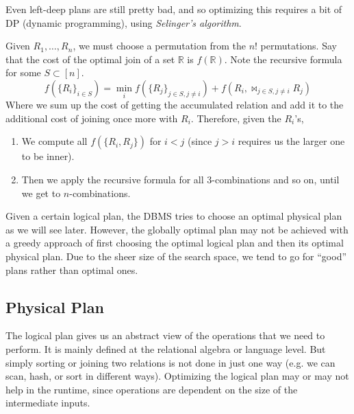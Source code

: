     Even left-deep plans are still pretty bad, and so optimizing this requires a bit of DP (dynamic programming), using \textit{Selinger's algorithm}. 

    \begin{algo}
      Given $R_1, \ldots, R_n$, we must choose a permutation from the $n!$ permutations. Say that the cost of the optimal join of a set $\mathbb{R}$ is $f(\mathbb{R})$. Note the recursive formula for some $S \subset [n]$. 
      \begin{equation}
        f(\{R_i\}_{i \in S}) = \min_i f(\{R_j\}_{j \in S, j \neq i}) + f(R_i, \bowtie_{j \in S, j \neq i} R_j) 
      \end{equation}
      Where we sum up the cost of getting the accumulated relation and add it to the additional cost of joining once more with $R_i$. Therefore, given the $R_i$'s, 
      \begin{enumerate}
        \item We compute all $f(\{R_i, R_j\})$ for $i < j$ (since $j > i$ requires us the larger one to be inner). 
        \item Then we apply the recursive formula for all 3-combinations and so on, until we get to $n$-combinations. 
      \end{enumerate}
    \end{algo}

    Given a certain logical plan, the DBMS tries to choose an optimal physical plan as we will see later. However, the globally optimal plan may not be achieved with a greedy approach of first choosing the optimal logical plan and then its optimal physical plan. Due to the sheer size of the search space, we tend to go for ``good'' plans rather than optimal ones. 

\subsection{Physical Plan}

    The logical plan gives us an abstract view of the operations that we need to perform. It is mainly defined at the relational algebra or language level. But simply sorting or joining two relations is not done 
    in just one way (e.g. we can scan, hash, or sort in different ways). Optimizing the logical plan may or may not help in the runtime, since operations are dependent on the size of the intermediate inputs. 

